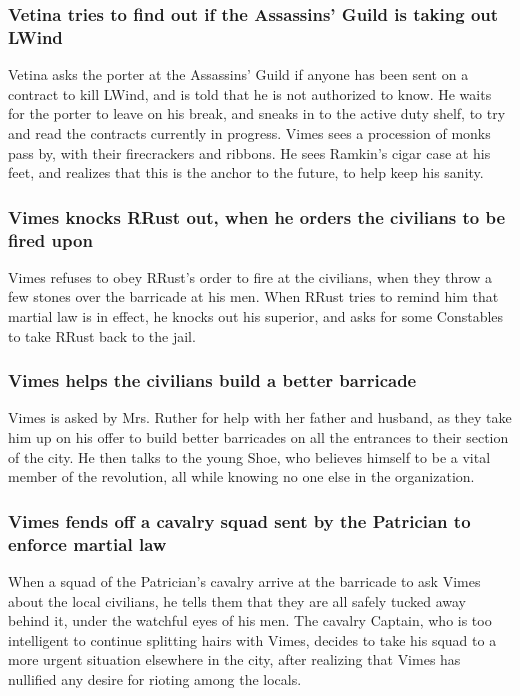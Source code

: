 \subsubsection{\Gls{Vetina} tries to find out if the Assassins' Guild is taking out \Gls{LWind}}
\Gls{Vetina} asks the porter at the Assassins' Guild if anyone has been sent on a contract to kill
\Gls{LWind}, and is told that he is not authorized to know. He waits for the porter to leave on his
break, and sneaks in to the active duty shelf, to try and read the contracts currently in progress.
\Gls{Vimes} sees a procession of monks pass by, with their firecrackers and ribbons. He sees
\Gls{Ramkin}'s cigar case at his feet, and realizes that this is the anchor to the future, to help
keep his sanity.

\subsubsection{\Gls{Vimes} knocks \Gls{RRust} out, when he orders the civilians to be fired upon}
\Gls{Vimes} refuses to obey \Gls{RRust}'s order to fire at the civilians, when they throw a few
stones over the barricade at his men. When \Gls{RRust} tries to remind him that martial law is in
effect, he knocks out his superior, and asks for some Constables to take \Gls{RRust} back to the
jail.

\subsubsection{\Gls{Vimes} helps the civilians build a better barricade}
\Gls{Vimes} is asked by Mrs. \Gls{Ruther} for help with her father and husband, as they take him up
on his offer to build better barricades on all the entrances to their section of the city. He then
talks to the young \Gls{Shoe}, who believes himself to be a vital member of the revolution, all
while knowing no one else in the organization.

\subsubsection{\Gls{Vimes} fends off a cavalry squad sent by the Patrician to enforce martial law}
When a squad of the Patrician's cavalry arrive at the barricade to ask \Gls{Vimes} about the local
civilians, he tells them that they are all safely tucked away behind it, under the watchful eyes of
his men. The cavalry Captain, who is too intelligent to continue splitting hairs with \Gls{Vimes},
decides to take his squad to a more urgent situation elsewhere in the city, after realizing that
\Gls{Vimes} has nullified any desire for rioting among the locals.

